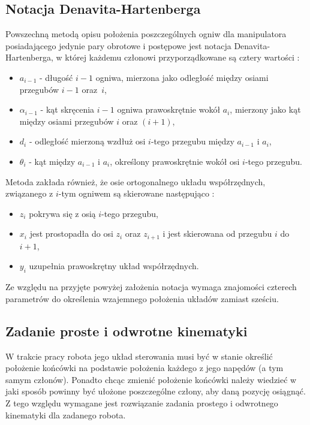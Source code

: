 \documentclass[a4paper, 12pt, twoside]{article}
\begin{document}
\subsection{Notacja Denavita-Hartenberga}

Powszechną metodą opisu położenia poszczególnych ogniw dla manipulatora posiadającego jedynie pary obrotowe i postępowe jest notacja Denavita-Hartenberga, w której każdemu członowi przyporządkowane są cztery wartości \cite{systemkozlowski}:

\begin{itemize}
\item $a_{i-1}$ - długość $i-1$ ogniwa, mierzona jako odległość między osiami przegubów $i-1$ oraz~$i$,
\item $\alpha_{i-1}$ - kąt skręcenia $i-1$ ogniwa prawoskrętnie wokół $a_i$, mierzony jako kąt między osiami przegubów $i$ oraz $(i+1)$,
\item $d_i$ - odległość mierzoną wzdłuż osi $i$-tego przegubu między $a_{i-1}$ i $a_i$,
\item $\theta_i$ - kąt między $a_{i-1}$ i $a_i$, określony prawoskrętnie wokół osi $i$-tego przegubu.
\end{itemize}

Metoda zakłada również, że osie ortogonalnego układu współrzędnych, związanego z $i$-tym ogniwem są skierowane następująco \cite{systemkozlowski}:

\begin{itemize}
\item $z_i$ pokrywa się z osią $i$-tego przegubu,
\item $x_i$ jest prostopadła do osi $z_i$ oraz $z_{i+1}$ i jest skierowana od przegubu $i$ do $i+1$,
\item $y_i$ uzupełnia prawoskrętny układ współrzędnych.
\end{itemize}

Ze względu na przyjęte powyżej założenia notacja wymaga znajomości czterech parametrów do określenia wzajemnego położenia układów zamiast sześciu.

\subsection{Zadanie proste i odwrotne kinematyki}

W trakcie pracy robota jego układ sterowania musi być w stanie określić położenie końcówki na podstawie położenia każdego z jego napędów (a tym samym członów). Ponadto chcąc zmienić położenie końcówki należy wiedzieć w jaki sposób powinny być ułożone poszczególne człony, aby daną pozycję osiągnąć. Z tego względu wymagane jest rozwiązanie zadania prostego i odwrotnego kinematyki dla zadanego robota.
\end{document}
